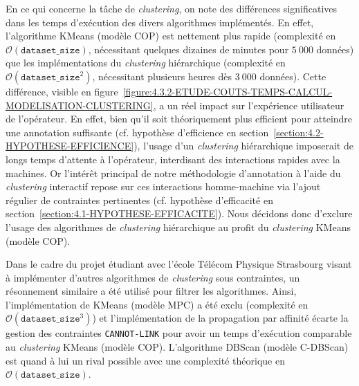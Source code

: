 			En ce qui concerne la tâche de \textit{clustering}, on note des différences significatives dans les temps d'exécution des divers algorithmes implémentés.
			En effet, l'algorithme KMeans (modèle COP) est nettement plus rapide (complexité en $ \mathcal{O}(\texttt{dataset\_size}) $, nécessitant quelques dizaines de minutes pour $5~000$ données) que les implémentations du \textit{clustering} hiérarchique (complexité en $ \mathcal{O}(\texttt{dataset\_size}^{2}) $, nécessitant plusieurs heures dès $3~000$ données).
			Cette différence, visible en figure~\ref{figure:4.3.2-ETUDE-COUTS-TEMPS-CALCUL-MODELISATION-CLUSTERING}, a un réel impact sur l'expérience utilisateur de l'opérateur.
			En effet, bien qu'il soit théoriquement plus efficient pour atteindre une annotation suffisante (cf. hypothèse d'efficience en section~\ref{section:4.2-HYPOTHESE-EFFICIENCE}), l'usage d'un \textit{clustering} hiérarchique imposerait de longs temps d'attente à l'opérateur, interdisant des interactions rapides avec la machines.
			Or l'intérêt principal de notre méthodologie d'annotation à l'aide du \textit{clustering} interactif repose sur ces interactions homme-machine via l'ajout régulier de contraintes pertinentes (cf. hypothèse d'efficacité en section~\ref{section:4.1-HYPOTHESE-EFFICACITE}).
			Nous décidons donc d'exclure l'usage des algorithmes de \textit{clustering} hiérarchique au profit du \textit{clustering} KMeans (modèle COP).
			
			\begin{leftBarInformation}
				Dans le cadre du projet étudiant avec l'école Télécom Physique Strasbourg visant à implémenter d'autres algorithmes de \textit{clustering} sous contraintes, un résonnement similaire a été utilisé pour filtrer les algorithmes. Ainsi, l'implémentation de KMeans (modèle MPC) a été exclu (complexité en $ \mathcal{O}(\texttt{dataset\_size}^{3}) $) et l'implémentation de la propagation par affinité écarte la gestion des contraintes \texttt{CANNOT-LINK} pour avoir un temps d'exécution comparable au \textit{clustering} KMeans (modèle COP). L'algorithme DBScan (modèle C-DBScan) est quand à lui un rival possible avec une complexité théorique en $ \mathcal{O}(\texttt{dataset\_size}) $.
			\end{leftBarInformation}
			
